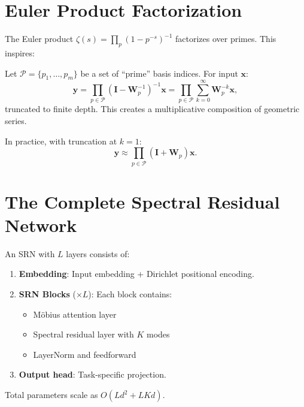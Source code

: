 \section{Euler Product Factorization}

The Euler product $\zeta(s) = \prod_p (1 - p^{-s})^{-1}$ factorizes over primes. This inspires:

\begin{definition}
  Let $\mathcal{P} = \{p_1, \ldots, p_m\}$ be a set of ``prime'' basis indices. For input $\mathbf{x}$:
  \begin{equation}
    \mathbf{y} = \prod_{p \in \mathcal{P}} \left(\mathbf{I} - \mathbf{W}_p^{-1}\right)^{-1} \mathbf{x} = \prod_{p \in \mathcal{P}} \sum_{k=0}^{\infty} \mathbf{W}_p^{-k} \mathbf{x},
  \end{equation}
  truncated to finite depth. This creates a multiplicative composition of geometric series.
\end{definition}

In practice, with truncation at $k=1$:
\begin{equation}
  \mathbf{y} \approx \prod_{p \in \mathcal{P}} (\mathbf{I} + \mathbf{W}_p) \mathbf{x}.
\end{equation}

\section{The Complete Spectral Residual Network}

\begin{definition}
  An SRN with $L$ layers consists of:
  \begin{enumerate}
    \item \textbf{Embedding}: Input embedding + Dirichlet positional encoding.
    \item \textbf{SRN Blocks} ($\times L$): Each block contains:
          \begin{itemize}
            \item M\"obius attention layer
            \item Spectral residual layer with $K$ modes
            \item LayerNorm and feedforward
          \end{itemize}
    \item \textbf{Output head}: Task-specific projection.
  \end{enumerate}
  Total parameters scale as $O(Ld^2 + LKd)$.
\end{definition}

